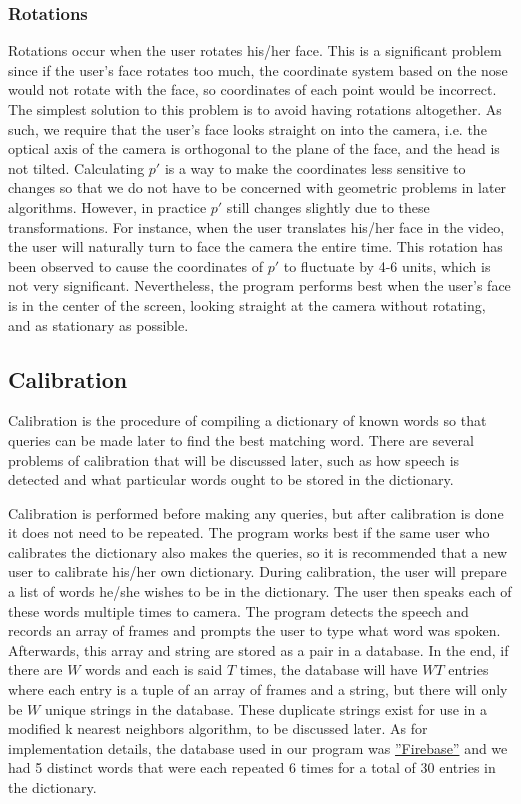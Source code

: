 \documentclass[10pt,twocolumn,letterpaper]{article}
\begin{document}
\subsubsection{Rotations}
Rotations occur when the user rotates his/her face. This is a significant problem since if the user’s face rotates too much, the coordinate system based on the nose would not rotate with the face, so coordinates of each point would be incorrect. The simplest solution to this problem is to avoid having rotations altogether. As such, we require that the user’s face looks straight on into the camera, i.e. the optical axis of the camera is orthogonal to the plane of the face, and the head is not tilted.
Calculating $p'$ is a way to make the coordinates less sensitive to changes so that we do not have to be concerned with geometric problems in later algorithms.
However, in practice $p'$ still changes slightly due to these transformations. For instance, when the user translates his/her face in the video, the user will naturally turn to face the camera the entire time. This rotation has been observed to cause the coordinates of $p'$ to fluctuate by 4-6 units, which is not very significant.
Nevertheless, the program performs best when the user’s face is in the center of the screen, looking straight at the camera without rotating, and as stationary as possible.
\subsection{Calibration}
Calibration is the procedure of compiling a dictionary of known words so that queries can be made later to find the best matching word. There are several problems of calibration that will be discussed later, such as how speech is detected and what particular words ought to be stored in the dictionary.

Calibration is performed before making any queries, but after calibration is done it does not need to be repeated. The program works best if the same user who calibrates the dictionary also makes the queries, so it is recommended that a new user to calibrate his/her own dictionary. During calibration, the user will prepare a list of words he/she wishes to be in the dictionary. The user then speaks each of these words multiple times to camera. The program detects the speech and records an array of frames and prompts the user to type what word was spoken. Afterwards, this array and string are stored as a pair in a database. In the end, if there are $W$ words and each is said $T$ times, the database will have $WT$ entries where each entry is a tuple of an array of frames and a string, but there will only be $W$ unique strings in the database. These duplicate strings exist for use in a modified k nearest neighbors algorithm, to be discussed later.
As for implementation details, the database used in our program was \hyperref[https://www.firebase.com/]{''Firebase''} and we had 5 distinct words that were each repeated 6 times for a total of 30 entries in the dictionary.
\end{document}
